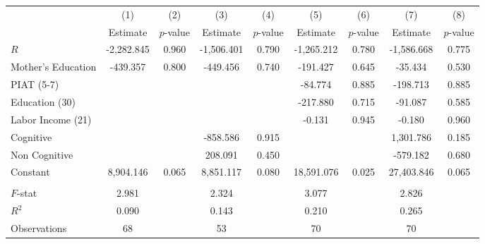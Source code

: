 \begin{tabular}{lcccccccc} \toprule
 & (1) & (2) & (3) & (4) & (5) & (6) & (7) & (8) \\ 
 & Estimate  & $p$-value  & Estimate  & $p$-value  & Estimate  & $p$-value  & Estimate  & $p$-value  \\  \midrule
$R$ & -2,282.845 &     0.960 & -1,506.401 &     0.790 & -1,265.212 &     0.780 & -1,586.668 &     0.775 \\  
Mother's Education &  -439.357 &     0.800 &  -449.456 &     0.740 &  -191.427 &     0.645 &   -35.434 &     0.530 \\  
PIAT (5-7) &         &         &         &         &   -84.774 &     0.885 &  -198.713 &     0.885 \\  
Education (30) &         &         &         &         &  -217.880 &     0.715 &   -91.087 &     0.585 \\  
Labor Income (21) &         &         &         &         &    -0.131 &     0.945 &    -0.180 &     0.960 \\  
Cognitive &         &         &  -858.586 &     0.915 &         &         &  1,301.786 &     0.185 \\  
Non Cognitive &         &         &   208.091 &     0.450 &         &         &  -579.182 &     0.680 \\  
Constant &  8,904.146 &     0.065 &  8,851.117 &     0.080 & 18,591.076 &     0.025 & 27,403.846 &     0.065 \\ \\  \midrule
$F$-stat &     2.981 &         &     2.324 &         &     3.077 &         &     2.826 &         \\  
$R^2$ &     0.090 &         &     0.143 &         &     0.210 &         &     0.265 &         \\  
Observations &    68 &         &    53 &         &    70 &         &    70 &         \\  
\bottomrule \end{tabular}
